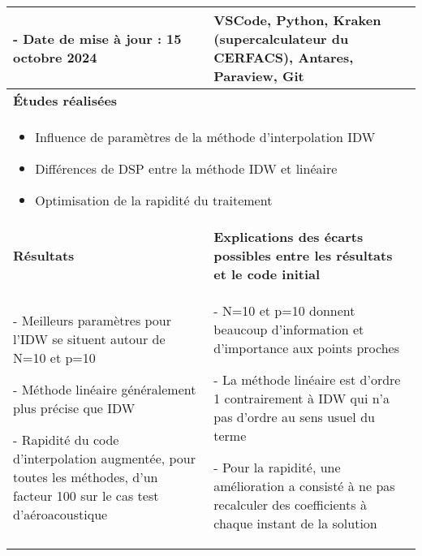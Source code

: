 \begin{table}[ht]
\begin{tabular}{|p{6.5cm}|p{8.5cm}|}
\begin{minipage}[t]{6.5cm}
- Date de mise à jour : 15 octobre 2024
\end{minipage} & 
\begin{minipage}[t]{8.5cm}
VSCode, Python, Kraken (supercalculateur du CERFACS), Antares, Paraview, Git
\end{minipage} \\ 
\hline
\multicolumn{2}{|l|}{\textbf{Études réalisées}} \\ 
\hline
\multicolumn{2}{|p{14cm}|}{
\begin{minipage}[t]{14cm}
\begin{itemize}
    \item Influence de paramètres de la méthode d'interpolation IDW
    \item Différences de DSP entre la méthode IDW et linéaire
    \item Optimisation de la rapidité du traitement
    \hspace{0.5cm}
\end{itemize}
\end{minipage}
} \\ 
\hline
\textbf{Résultats} & \textbf{Explications des écarts possibles entre les résultats et le code initial} \\ 
\hline
\begin{minipage}[t]{6.5cm}

- Meilleurs paramètres pour l'IDW se situent autour de N=10 et p=10

- Méthode linéaire généralement plus précise que IDW

- Rapidité du code d'interpolation augmentée, pour toutes les méthodes, d'un facteur 100 sur le cas test d'aéroacoustique

\end{minipage} & 
\begin{minipage}[t]{8.5cm}

- N=10 et p=10 donnent beaucoup d'information et d'importance aux points proches

- La méthode linéaire est d'ordre 1 contrairement à IDW qui n'a pas d'ordre au sens usuel du terme

- Pour la rapidité, une amélioration a consisté à ne pas recalculer des coefficients à chaque instant de la solution


\end{minipage}
\end{tabular}
\end{table}
